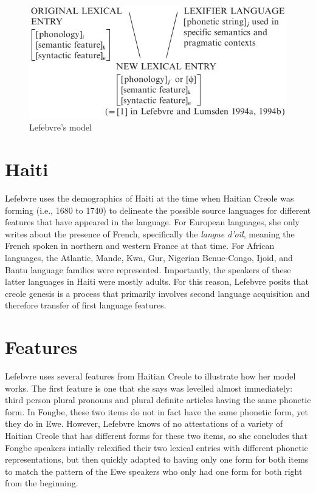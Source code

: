 \documentclass{article}
\newcommand{\lexi}[1]{\textit{#1}}
\begin{document}
      \begin{figure}[tbhp]
        \caption{Lefebvre's model}
        \label{fig:model}
        \centering
          \includegraphics[scale=0.6]{general_model.jpg}
      \end{figure}

    \section{Haiti}
      Lefebvre uses the demographics of Haiti at the time when Haitian Creole was forming (i.e., 1680 to 1740) to delineate the possible source languages for different features that have appeared in the language.
      For European languages, she only writes about the presence of French, specifically the \lexi{langue d'oïl}, meaning the French spoken in northern and western France at that time.
      For African languages, the Atlantic, Mande, Kwa, Gur, Nigerian Benue-Congo, Ijoid, and Bantu language families were represented.
      Importantly, the speakers of these latter languages in Haiti were mostly adults.
      For this reason, Lefebvre posits that creole genesis is a process that primarily involves second language acquisition and therefore transfer of first language features.

    \section{Features}
      Lefebvre uses several features from Haitian Creole to illustrate how her model works.
      The first feature is one that she says was levelled almost immediately: third person plural pronouns and plural definite articles having the same phonetic form.
      In Fongbe, these two items do not in fact have the same phonetic form, yet they do in Ewe.
      However, Lefebvre knows of no attestations of a variety of Haitian Creole that has different forms for these two items, so she concludes that Fongbe speakers intially relexified their two lexical entries with different phonetic representations, but then quickly adapted to having only one form for both items to match the pattern of the Ewe speakers who only had one form for both right from the beginning.
\end{document}
